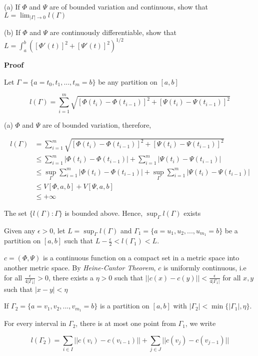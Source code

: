\documentclass{article}
\begin{document}
\tab (a) If $\Phi$ and $\Psi$ are of bounded variation and continuous, show that $L = \lim_{|\Gamma| \to 0} l(\Gamma)$

\tab (b) If $\Phi$ and $\Psi$ are continuously differentiable, show that $L = \int_a^b ([\Phi'(t)]^2 + [\Psi'(t)]^2)^{1/2}$

\textbf{Proof}

Let $\Gamma = \{a = t_0, t_1, ..., t_m = b \}$ be any partition on $[a, b]$

$$
    l(\Gamma) = \sum_{i=1}^m \sqrt{[\Phi(t_i) - \Phi(t_{i-1})]^2 + [\Psi(t_i) - \Psi(t_{i-1})]^2}
$$

(a) $\Phi$ and $\Psi$ are of bounded variation, therefore, 

\begin{align*}
    l(\Gamma)
        &= \sum_{i=1}^m \sqrt{[\Phi(t_i) - \Phi(t_{i-1})]^2 + [\Psi(t_i) - \Psi(t_{i-1})]^2} \\
        &\leq \sum_{i=1}^m |\Phi(t_i) - \Phi(t_{i-1})| + \sum_{i=1}^m |\Psi(t_i) - \Psi(t_{i-1})| \\
        &\leq \sup_{\Gamma} \sum_{i=1}^m |\Phi(t_i) - \Phi(t_{i-1})| + \sup_{\Gamma} \sum_{i=1}^m |\Psi(t_i) - \Psi(t_{i-1})| \\
        &\leq V[\Phi, a, b] + V[\Psi, a, b] \\
        &\leq +\infty
\end{align*}

The set $\{l(\Gamma): \Gamma \}$ is bounded above. Hence, $\sup_\Gamma l(\Gamma)$ exists

Given any $\epsilon > 0$, let $L = \sup_\Gamma l(\Gamma)$ and $\Gamma_1 = \{a = u_1, u_2, ..., u_{m_1} = b \}$ be a partition on $[a, b]$ such that $L - \frac{\epsilon}{2} < l(\Gamma_1) < L$.



$c = (\Phi, \Psi)$ is a continuous function on a compact set in a metric space into another metric space. By \emph{Heine-Cantor Theorem}, $c$ is uniformly continuous, i.e for all $\frac{\epsilon}{4 |\Gamma_1|} > 0$, there exists a $\eta > 0$ such that $||c(x) - c(y)|| < \frac{\epsilon}{4 |\Gamma_1|}$ for all $x, y$ such that $|x - y| < \eta$

If $\Gamma_2 = \{a = v_1, v_2, ..., v_{m_1} = b \}$ is a partition on $[a, b]$ with $|\Gamma_2| < \min \{ |\Gamma_1|, \eta\}$.

For every interval in $\Gamma_2$, there is at most one point from $\Gamma_1$, we write

$$
    l(\Gamma_2) = \sum_{i \in I} ||c(v_i) - c(v_{i-1})|| + \sum_{j \in J} ||c(v_j) - c(v_{j-1})||
$$
\end{document}
